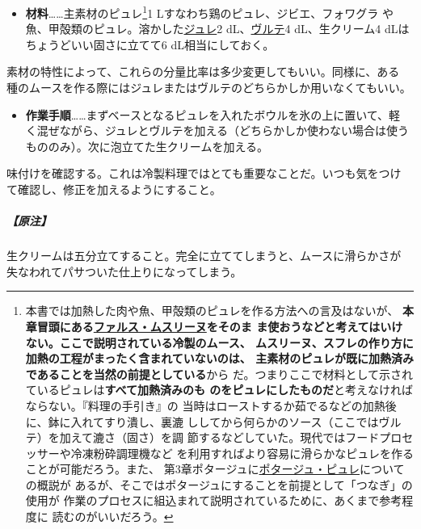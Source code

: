 \begin{recette}
\begin{itemize}
\tightlist
\item
  \textbf{材料}\ldots{}\ldots{}主素材のピュレ\footnote{本書では加熱した肉や魚、甲殻類のピュレを作る方法への言及はないが、
    \textbf{本章冒頭にある\protect\hyperlink{farce-mousseline}{ファルス・ムスリーヌ}をそのま
    ま使おうなどと考えてはいけない。ここで説明されている冷製のムース、
    ムスリーヌ、スフレの作り方に加熱の工程がまったく含まれていないのは、
    主素材のピュレが既に加熱済みであることを当然の前提としている}から
    だ。つまりここで材料として示されているピュレは\textbf{すべて加熱済みのも
    のをピュレにしたものだ}と考えなければならない。『料理の手引き』の
    当時はローストするか茹でるなどの加熱後に、鉢に入れてすり潰し、裏漉
    ししてから何らかのソース（ここではヴルテ）を加えて漉さ（固さ）を調
    節するなどしていた。現代ではフードプロセッサーや冷凍粉砕調理機など
    を利用すればより容易に滑らかなピュレを作ることが可能だろう。また、
    第3章ポタージュに\protect\hyperlink{les-purees}{ポタージュ・ピュレ}についての概説が
    あるが、そこではポタージュにすることを前提として「つなぎ」の使用が
    作業のプロセスに組込まれて説明されているために、あくまで参考程度に
    読むのがいいだろう。}1 Lすなわち鶏のピュレ、ジビエ、フォワグラ
  や魚、甲殻類のピュレ。溶かした\protect\hyperlink{gelees-ordinaires}{ジュレ}2\undemi{}
  dL、\protect\hyperlink{veloute}{ヴルテ}4 dL、生クリーム4
  dLはちょうどいい固さに立てて6 dL相当にしておく。
\end{itemize}

素材の特性によって、これらの分量比率は多少変更してもいい。同様に、ある
種のムースを作る際にはジュレまたはヴルテのどちらかしか用いなくてもいい。

\begin{itemize}
\tightlist
\item
  \textbf{作業手順}\ldots{}\ldots{}まずベースとなるピュレを入れたボウルを氷の上に置いて、軽
  く混ぜながら、ジュレとヴルテを加える（どちらかしか使わない場合は使う
  もののみ）。次に泡立てた生クリームを加える。
\end{itemize}

味付けを確認する。これは冷製料理ではとても重要なことだ。いつも気をつけ
て確認し、修正を加えるようにすること。

\hypertarget{nota-composition-de-l-appareil-pour-mousses-et-mousseline-froides}{%
\subparagraph{【原注】}\label{nota-composition-de-l-appareil-pour-mousses-et-mousseline-froides}}

生クリームは五分立てすること。完全に立ててしまうと、ムースに滑らかさが
失なわれてパサついた仕上りになってしまう。


\end{recette}
